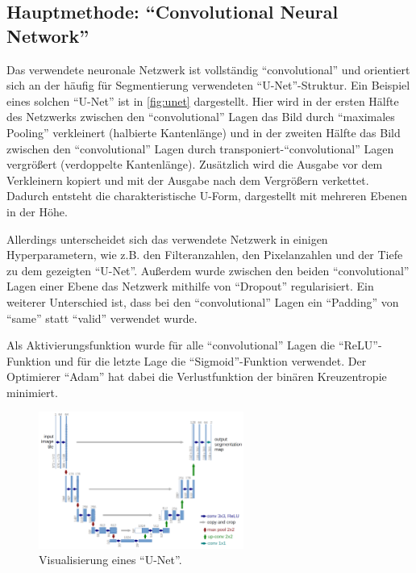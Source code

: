 \subsection{Hauptmethode: \enquote{Convolutional Neural Network}}
\label{ssec:Hauptmethode}

Das verwendete neuronale Netzwerk ist vollständig \enquote{convolutional} und orientiert sich an der häufig für Segmentierung verwendeten \enquote{U-Net}-Struktur.\cite{ronneberger2015unet}
Ein Beispiel eines solchen \enquote{U-Net} ist in \autoref{fig:unet} dargestellt.
Hier wird in der ersten Hälfte des Netzwerks zwischen den \enquote{convolutional} Lagen das Bild durch \enquote{maximales Pooling} verkleinert (halbierte Kantenlänge) 
und in der zweiten Hälfte das Bild zwischen den \enquote{convolutional} Lagen durch transponiert-\enquote{convolutional} Lagen vergrößert (verdoppelte Kantenlänge).
Zusätzlich wird die Ausgabe vor dem Verkleinern kopiert und mit der Ausgabe nach dem Vergrößern verkettet. 
Dadurch entsteht die charakteristische U-Form, dargestellt mit mehreren Ebenen in der Höhe.

Allerdings unterscheidet sich das verwendete Netzwerk in einigen Hyperparametern, wie z.B. den Filteranzahlen, den Pixelanzahlen und der Tiefe zu dem gezeigten \enquote{U-Net}.
Außerdem wurde zwischen den beiden \enquote{convolutional} Lagen einer Ebene das Netzwerk mithilfe von \enquote{Dropout} regularisiert.
Ein weiterer Unterschied ist, dass bei den \enquote{convolutional} Lagen ein \enquote{Padding} von \enquote{same} statt \enquote{valid} verwendet wurde.

Als Aktivierungsfunktion wurde für alle \enquote{convolutional} Lagen die \enquote{ReLU}-Funktion und für die letzte Lage die \enquote{Sigmoid}-Funktion verwendet.
Der Optimierer \enquote{Adam} hat dabei die Verlustfunktion der binären Kreuzentropie minimiert.

\begin{figure}
    \centering
    \includegraphics[width=0.6\textwidth]{images/unet.png}
    \caption{Visualisierung eines \enquote{U-Net}.\cite{ronneberger2015unet}}
    \label{fig:unet}
\end{figure}

